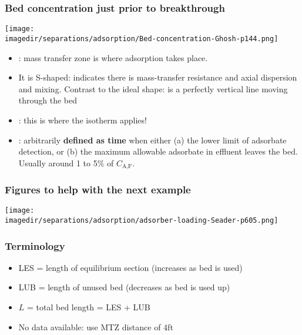 \begin{frame}\frametitle{Bed concentration just prior to breakthrough}
	\begin{center}
		\texttt{[image: \\imagedir/separations/adsorption/Bed-concentration-Ghosh-p144.png]}
	\end{center}
	\vspace{-12pt}
	\vspace{6pt}
	{\small
		\begin{itemize}
			\item	{\color{purple}{MTZ}}: mass transfer zone is where adsorption takes place.%
			\item	It is S-shaped: indicates there is mass-transfer resistance and axial dispersion and mixing. Contrast to the ideal shape: is a perfectly vertical line moving through the bed
			\item	{\color{purple}{Equilibrium zone}}: this is where the isotherm applies!
			\item	{\color{purple}{Breakthrough}}: arbitrarily \textbf{defined as time} when either (a)  the lower limit of adsorbate detection, or (b) the maximum allowable adsorbate in effluent leaves the bed. Usually around 1 to 5\% of $C_\text{A,F}$.
		\end{itemize}
	}
\end{frame}

\begin{frame}\frametitle{Figures to help with the next example}
	\begin{center}
		\texttt{[image: \\imagedir/separations/adsorption/adsorber-loading-Seader-p605.png]}
	\end{center}
	\vspace{-24pt}
\end{frame}

\begin{frame}\frametitle{Terminology}
	\begin{itemize}
		\item	{\color{purple}LES} = length of equilibrium section (increases as bed is used)
		\item	{\color{purple}LUB} = length of unused bed (decreases as bed is used up)
		\item	$L$ = total bed length = LES + LUB
		\item	No data available: use MTZ distance of 4ft
	\end{itemize}
\end{frame}

